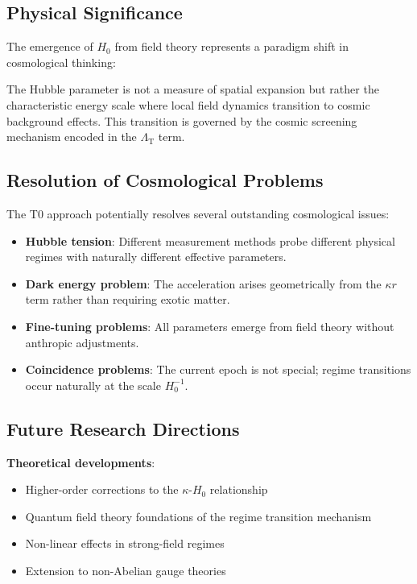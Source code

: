 \documentclass[12pt,a4paper]{article}
\newcommand{\LambdaT}{\Lambda_{\text{T}}}
\newcommand{\Hzero}{H_0}
\newcommand{\kappaparam}{\kappa}
\begin{document}
	\subsection{Physical Significance}
	\label{subsec:physical_significance}
	
	The emergence of $H_0$ from field theory represents a paradigm shift in cosmological thinking:
	
	\begin{tcolorbox}[colback=green!5!white,colframe=green!75!black,title=Fundamental Insight]
		The Hubble parameter is not a measure of spatial expansion but rather the characteristic energy scale where local field dynamics transition to cosmic background effects. This transition is governed by the cosmic screening mechanism encoded in the $\LambdaT$ term.
	\end{tcolorbox}
	
	\subsection{Resolution of Cosmological Problems}
	\label{subsec:problem_resolution}
	
	The T0 approach potentially resolves several outstanding cosmological issues:
	
	\begin{itemize}
		\item \textbf{Hubble tension}: Different measurement methods probe different physical regimes with naturally different effective parameters.
		\item \textbf{Dark energy problem}: The acceleration arises geometrically from the $\kappaparam r$ term rather than requiring exotic matter.
		\item \textbf{Fine-tuning problems}: All parameters emerge from field theory without anthropic adjustments.
		\item \textbf{Coincidence problems}: The current epoch is not special; regime transitions occur naturally at the scale $\Hzero^{-1}$.
	\end{itemize}
	
	\subsection{Future Research Directions}
	\label{subsec:future_directions}
	
	\textbf{Theoretical developments}:
	\begin{itemize}
		\item Higher-order corrections to the $\kappa$-$H_0$ relationship
		\item Quantum field theory foundations of the regime transition mechanism
		\item Non-linear effects in strong-field regimes
		\item Extension to non-Abelian gauge theories
	\end{itemize}
	
\end{document}
